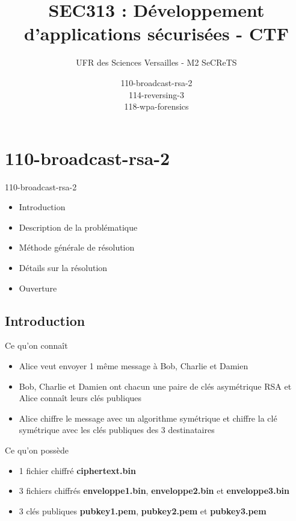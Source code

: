 \documentclass{beamer}
\title{SEC313 : Développement d'applications sécurisées - CTF}
\author{UFR des Sciences Versailles - M2 SeCReTS}
\institute{AYOUB Pierre \& CAUMES Clément \& \\ DEBROUASSE Kevin \& Mehdi MTALSI-MERIMI}
\date{110-broadcast-rsa-2 \\ 114-reversing-3 \\ 118-wpa-forensics}
\begin{document}
  \begin{frame}
  \titlepage
  \end{frame}


	\section{110-broadcast-rsa-2}
	\begin{frame}
	\begin{block}{110-broadcast-rsa-2}
		\begin{itemize}
			\item Introduction
			\item Description de la problématique
			\item Méthode générale de résolution
			\item Détails sur la résolution
			\item Ouverture
		\end{itemize}
	\end{block}

	\end{frame}

	\subsection{Introduction}

	\begin{frame}
	\begin{block}{Ce qu'on connaît}
		\begin{itemize}
			\item Alice veut envoyer 1 même message à Bob, Charlie et Damien
			\item Bob, Charlie et Damien ont chacun une paire de clés asymétrique RSA et Alice connaît leurs clés publiques
			\item Alice chiffre le message avec un algorithme symétrique et chiffre la clé symétrique avec les clés publiques des 3 destinataires
		\end{itemize}
	\end{block}

	\begin{block}{Ce qu'on possède}
		\begin{itemize}
			\item 1 fichier chiffré \textbf{ciphertext.bin}
			\item 3 fichiers chiffrés \textbf{enveloppe1.bin}, \textbf{enveloppe2.bin} et \textbf{enveloppe3.bin}
			\item 3 clés publiques \textbf{pubkey1.pem}, \textbf{pubkey2.pem} et \textbf{pubkey3.pem}
		\end{itemize}
	\end{block}

    \end{frame}
\end{document}
